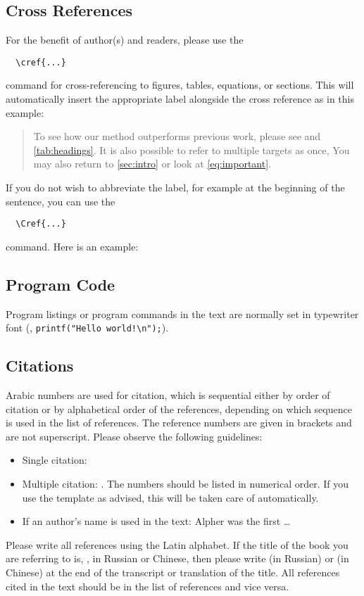 \documentclass[runningheads]{eccv/llncs}
\begin{document}
\subsection{Cross References}
For the benefit of author(s) and readers, please use the
\begin{verbatim}
  \cref{...}
\end{verbatim}
command for cross-referencing to figures, tables, equations, or sections.
This will automatically insert the appropriate label alongside the cross reference as in this example:
\begin{quotation}
  To see how our method outperforms previous work, please see %
  and \cref{tab:headings}.
  It is also possible to refer to multiple targets as once, 
  You may also return to \cref{sec:intro} or look at \cref{eq:important}.
\end{quotation}
If you do not wish to abbreviate the label, for example at the beginning of the sentence, you can use the
\begin{verbatim}
  \Cref{...}
\end{verbatim}
command. Here is an example:


\subsection{Program Code}
Program listings or program commands in the text are normally set in typewriter font (\eg, \texttt{printf("Hello world!\textbackslash{}n");}).


\subsection{Citations}
Arabic numbers are used for citation, which is sequential either by order of citation or by alphabetical order of the references, depending on which sequence is used in the list of references. 
The reference numbers are given in brackets and are not superscript.
Please observe the following guidelines:
\begin{itemize}
\item Single citation: \cite{Anonymous24}
\item Multiple citation: \cite{Alpher02,Alpher03,Alpher05,Anonymous24b,Anonymous24}. 
  The numbers should be listed in numerical order.
  If you use the template as advised, this will be taken care of automatically.
\item If an author's name is used in the text: Alpher \cite{Alpher02} was the first \ldots
\end{itemize}
Please write all references using the Latin alphabet. If the title of the book you are referring to is, \eg, in Russian or Chinese, then please write (in Russian) or (in Chinese) at the end of the transcript or translation of the title.
All references cited in the text should be in the list of references and vice versa.
\end{document}
